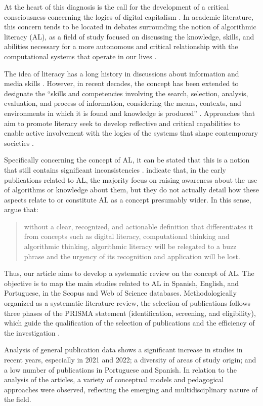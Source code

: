 At the heart of this diagnosis is the call for the development of a critical consciousness concerning the logics of digital capitalism \cite{Buckingham2022}. In academic literature, this concern tends to be located in debates surrounding the notion of algorithmic literacy (AL), as a field of study focused on discussing the knowledge, skills, and abilities necessary for a more autonomous and critical relationship with the computational systems that operate in our lives \cite{Devito2021}.

The idea of literacy has a long history in discussions about information and media skills \cite{Mora2016}. However, in recent decades, the concept has been extended to designate the “skills and competencies involving the search, selection, analysis, evaluation, and process of information, considering the means, contexts, and environments in which it is found and knowledge is produced” \cite[p. 26]{Rosa2016}. Approaches that aim to promote literacy seek to develop reflective and critical capabilities to enable active involvement with the logics of the systems that shape contemporary societies \cite{Pangrazio2022}.

Specifically concerning the concept of AL, it can be stated that this is a notion that still contains significant inconsistencies \cite{Hargittai2020}. \textcite{DogrueL2022} indicate that, in the early publications related to AL, the majority focus on raising awareness about the use of algorithms or knowledge about them, but they do not actually detail how these aspects relate to or constitute AL as a concept presumably wider. In this sense, \textcite[p. 2]{Ridley2021} argue that:

\begin{quote}
without a clear, recognized, and actionable definition that differentiates it from concepts such as digital literacy, computational thinking and algorithmic thinking, algorithmic literacy will be relegated to a buzz phrase and the urgency of its recognition and application will be lost.
\end{quote}

Thus, our article aims to develop a systematic review on the concept of AL. The objective is to map the main studies related to AL in Spanish, English, and Portuguese, in the Scopus and Web of Science databases. Methodologically organized as a systematic literature review, the selection of publications follows three phases of the PRISMA statement (identification, screening, and eligibility), which guide the qualification of the selection of publications and the efficiency of the investigation \cite{Moher2009}.

Analysis of general publication data shows a significant increase in studies in recent years, especially in 2021 and 2022; a diversity of areas of study origin; and a low number of publications in Portuguese and Spanish. In relation to the analysis of the articles, a variety of conceptual models and pedagogical approaches were observed, reflecting the emerging and multidisciplinary nature of the field.